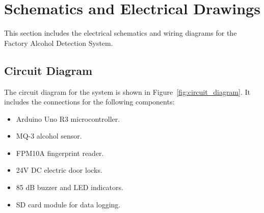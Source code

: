 \section{Schematics and Electrical Drawings}
\label{app:schematics}

This section includes the electrical schematics and wiring diagrams for the Factory Alcohol Detection System.

\subsection{Circuit Diagram}
The circuit diagram for the system is shown in Figure~\ref{fig:circuit_diagram}. It includes the connections for the following components:
\begin{itemize}
    \item Arduino Uno R3 microcontroller.
    \item MQ-3 alcohol sensor.
    \item FPM10A fingerprint reader.
    \item 24V DC electric door locks.
    \item 85 dB buzzer and LED indicators.
    \item SD card module for data logging.
\end{itemize}

